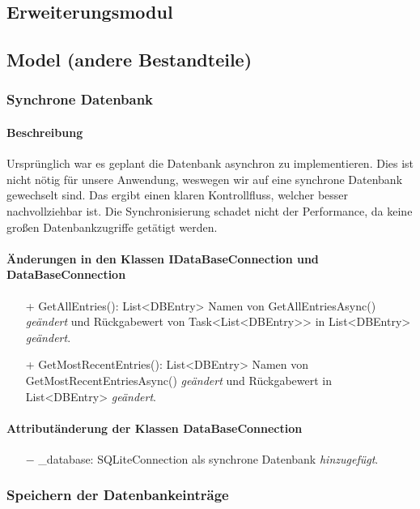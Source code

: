 \documentclass[a4paper,12pt]{article}
\begin{document}
\subsection{Erweiterungsmodul}

\subsection{Model (andere Bestandteile)}

\subsubsection{Synchrone Datenbank}
\paragraph{Beschreibung}
Ursprünglich war es geplant die Datenbank asynchron zu implementieren. Dies ist nicht nötig für unsere Anwendung, weswegen wir auf eine synchrone Datenbank gewechselt sind. Das ergibt einen klaren Kontrollfluss, welcher besser nachvollziehbar ist. Die Synchronisierung schadet nicht der Performance, da keine großen Datenbankzugriffe getätigt werden.

\paragraph{Änderungen in den Klassen IDataBaseConnection und DataBaseConnection}
\begin{itemize}
	\item[+] GetAllEntries(): List<DBEntry> Namen von GetAllEntriesAsync() \textit{geändert} und Rückgabewert von Task<List<DBEntry>> in List<DBEntry> \textit{geändert}.
	\item[+] GetMostRecentEntries(): List<DBEntry> Namen von GetMostRecentEntriesAsync() \textit{geändert} und Rückgabewert in List<DBEntry> \textit{geändert}.
\end{itemize}
\paragraph{Attributänderung der Klassen DataBaseConnection}
\begin{itemize}
	\item[$-$] \_database: SQLiteConnection als synchrone Datenbank \textit{hinzugefügt}.
\end{itemize}

\subsubsection{Speichern der Datenbankeinträge}
\end{document}
